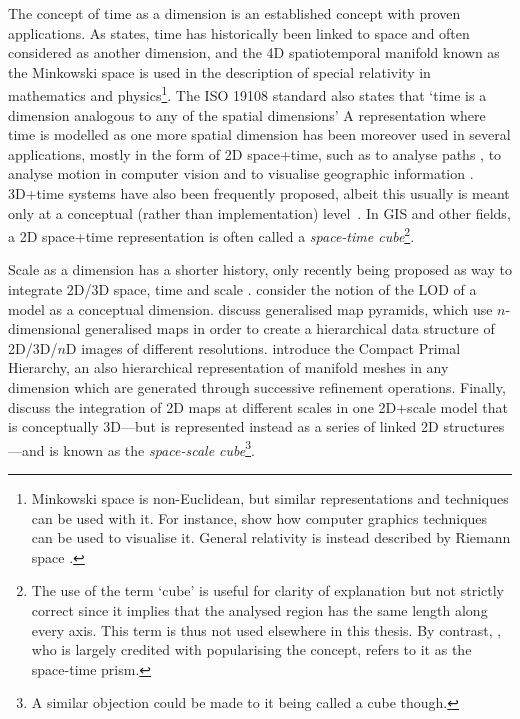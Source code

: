 The concept of time as a dimension is an established concept with proven applications.
As \citet{Couclelis99} states, time has historically been linked to space and often considered as another dimension, and the 4D spatiotemporal manifold known as the Minkowski space \citep{Minkowski08} is used in the description of special relativity in mathematics and physics\footnote{Minkowski space is non-Euclidean, but similar representations and techniques can be used with it.
For instance, \citet{Hanson01} show how computer graphics techniques can be used to visualise it.
General relativity is instead described by Riemann space \citep{Riemann68}.}.
The ISO 19108 standard also states that `time is a dimension analogous to any of the spatial dimensions' \citep{ISO19108:2002}
A representation where time is modelled as one more spatial dimension has been moreover used in several applications, mostly in the form of 2D space+time, such as to analyse paths \citep{Hagerstrand70}, to analyse motion in computer vision \citep{Basri05} and to visualise geographic information \citep{Kraak03}.
3D+time systems have also been frequently proposed, albeit this usually is meant only at a conceptual (rather than implementation) level~\citep{Galton04}.
In GIS and other fields, a 2D space+time representation is often called a \emph{space-time cube}\footnote{The use of the term `cube' is useful for clarity of explanation but not strictly correct since it implies that the analysed region has the same length along every axis.
This term is thus not used elsewhere in this thesis.
By contrast, \citet{Hagerstrand70}, who is largely credited with popularising the concept, refers to it as the space-time prism.}.


Scale as a dimension has a shorter history, only recently being proposed as way to integrate 2D/3D space, time and scale \citep{vanOosterom10}.
\citet{Dollner05} consider the notion of the LOD of a model as a conceptual dimension.
\citet{Grasset-Simon06} discuss generalised map pyramids, which use $n$-dimensional generalised maps in order to create a hierarchical data structure of 2D/3D/$n$D images of different resolutions.
\citet{Untereiner15} introduce the Compact Primal Hierarchy, an also hierarchical representation of manifold meshes in any dimension which are generated through successive refinement operations.
Finally, \citet{vanOosterom14} discuss the integration of 2D maps at different scales in one 2D+scale model that is conceptually 3D---but is represented instead as a series of linked 2D structures---and is known as the \emph{space-scale cube}\footnote{A similar objection could be made to it being called a cube though.}.

